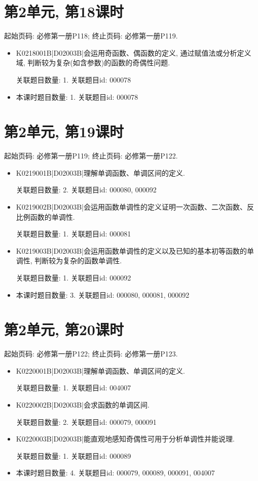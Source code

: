 \section*{第2单元, 第18课时}
起始页码: 必修第一册P118; 终止页码: 必修第一册P119.
\begin{itemize}
\item K0218001B|D02003B|会运用奇函数、偶函数的定义, 通过赋值法或分析定义域, 判断较为复杂(如含参数)的函数的奇偶性问题.

关联题目数量: 1. 关联题目id: 000078

\item 本课时题目数量: 1. 关联题目id: 000078

\end{itemize}

\section*{第2单元, 第19课时}
起始页码: 必修第一册P119; 终止页码: 必修第一册P122.
\begin{itemize}
\item K0219001B|D02003B|理解单调函数、单调区间的定义.

关联题目数量: 2. 关联题目id: 000080, 000092

\item K0219002B|D02003B|会运用函数单调性的定义证明一次函数、二次函数、反比例函数的单调性.

关联题目数量: 1. 关联题目id: 000081

\item K0219003B|D02003B|会运用函数单调性的定义以及已知的基本初等函数的单调性, 判断较为复杂的函数单调性.

关联题目数量: 1. 关联题目id: 000092

\item 本课时题目数量: 3. 关联题目id: 000080, 000081, 000092

\end{itemize}

\section*{第2单元, 第20课时}
起始页码: 必修第一册P122; 终止页码: 必修第一册P123.
\begin{itemize}
\item K0220001B|D02003B|理解单调函数、单调区间的定义.

关联题目数量: 1. 关联题目id: 004007

\item K0220002B|D02003B|会求函数的单调区间.

关联题目数量: 2. 关联题目id: 000079, 000091

\item K0220003B|D02003B|能直观地感知奇偶性可用于分析单调性并能说理.

关联题目数量: 1. 关联题目id: 000089

\item 本课时题目数量: 4. 关联题目id: 000079, 000089, 000091, 004007

\end{itemize}

